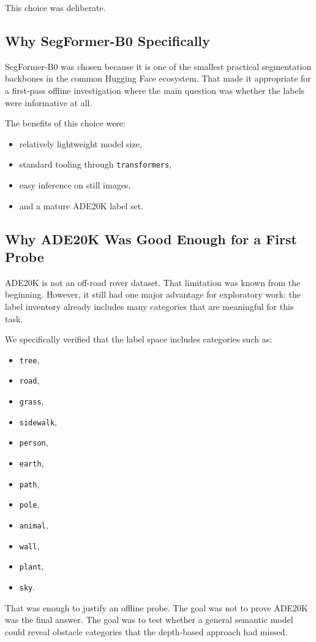 \documentclass[11pt]{article}
\begin{document}
This choice was deliberate.

\subsection{Why SegFormer-B0 Specifically}
SegFormer-B0 was chosen because it is one of the smallest practical segmentation backbones in the common Hugging Face ecosystem. That made it appropriate for a first-pass offline investigation where the main question was whether the labels were informative at all.

The benefits of this choice were:
\begin{itemize}[leftmargin=*]
\item relatively lightweight model size,
\item standard tooling through \texttt{transformers},
\item easy inference on still images,
\item and a mature ADE20K label set.
\end{itemize}

\subsection{Why ADE20K Was Good Enough for a First Probe}
ADE20K is not an off-road rover dataset. That limitation was known from the beginning. However, it still had one major advantage for exploratory work: the label inventory already includes many categories that are meaningful for this task.

We specifically verified that the label space includes categories such as:
\begin{itemize}[leftmargin=*]
\item \texttt{tree},
\item \texttt{road},
\item \texttt{grass},
\item \texttt{sidewalk},
\item \texttt{person},
\item \texttt{earth},
\item \texttt{path},
\item \texttt{pole},
\item \texttt{animal},
\item \texttt{wall},
\item \texttt{plant},
\item \texttt{sky}.
\end{itemize}

That was enough to justify an offline probe. The goal was not to prove ADE20K was the final answer. The goal was to test whether a general semantic model could reveal obstacle categories that the depth-based approach had missed.
\end{document}
